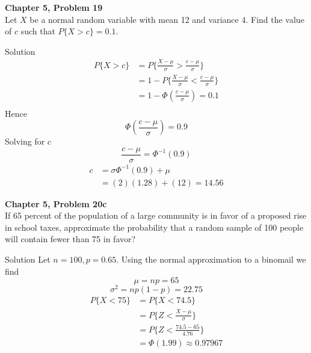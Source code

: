 \documentclass{article}
\begin{document}
\begin{spacing}{1.1}
\maketitle

\newpage
\begin{homeworkProblem}
  {\bf Chapter 5, Problem 19}\\
  Let $X$ be a normal random variable with mean 12 and variance 4. 
  Find the value of $c$ such that $P\{X > c\} = 0.1$.
  \begin{homeworkSection}{Solution}
    \begin{align*}
      P\{X > c\} &= P\{\frac{ X - \mu}{ \sigma} > \frac{ c - \mu}{ \sigma}\}\\
      &= 1 - P\{\frac{ X - \mu}{ \sigma} < \frac{ c - \mu}{ \sigma}\}\\
      &= 1 - \Phi(\frac{ c - \mu}{ \sigma}) = 0.1\\
    \end{align*}
    Hence
    \[\Phi(\frac{ c - \mu}{ \sigma}) = 0.9\]
    Solving for $c$
    \[\frac{ c - \mu}{ \sigma} = \Phi^{-1}( 0.9)\]
    \begin{align*}
      c &= \sigma \Phi^{-1}(0.9) + \mu\\
        &= (2) (1.28) + (12) = 14.56
    \end{align*}
  \end{homeworkSection}
\end{homeworkProblem}

\newpage
\begin{homeworkProblem}
  {\bf Chapter 5, Problem 20c}\\
  If 65 percent of the population of a large community is in favor of a 
  proposed rise in school taxes, approximate the probability that a random 
  sample of 100 people will contain fewer than 75 in favor?
  \begin{homeworkSection}{Solution}
    Let $n = 100, p= 0.65$.  Using the normal approximation to a binomail we
    find
    \[\mu = np = 65\]
    \[\sigma^2 = np(1 - p) = 22.75\]
    \begin{align*}
      P\{X < 75\} &= P\{X < 74.5\}\\
                &= P\{ Z < \frac{ X - \mu}{ \sigma}\}\\
                &= P\{ Z < \frac{ 74.5 - 65}{ 4.76}\}\\
                &= \Phi( 1.99) \approx 0.97967
    \end{align*}
  \end{homeworkSection}
\end{homeworkProblem}


\end{spacing}
\end{document}
